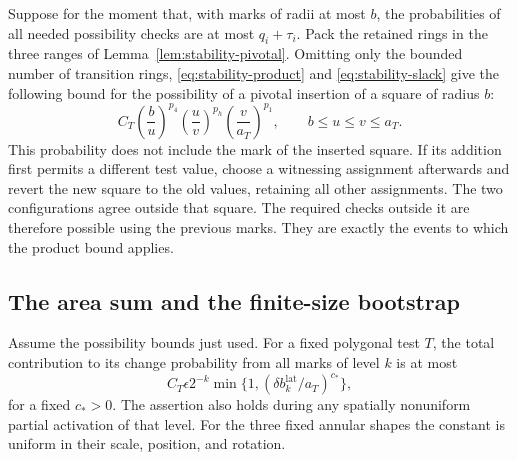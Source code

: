 Suppose for the moment that, with marks of radii at most $b$,
the probabilities of all needed possibility checks are at most
$q_i+\tau_i$.  Pack the retained rings in the three ranges of
Lemma~\ref{lem:stability-pivotal}.  Omitting only the bounded
number of transition rings, \eqref{eq:stability-product} and
\eqref{eq:stability-slack} give the following bound for the
possibility of a pivotal insertion of a square of radius $b$:
\begin{equation}
 C_T\left(\frac b u\right)^{p_4}
     \left(\frac u v\right)^{p_h}
     \left(\frac v{a_T}\right)^{p_1},
 \qquad b\leq u\leq v\leq a_T.
 \label{eq:stability-pivotal-probability}
\end{equation}
This probability does not include the mark of the inserted square.
If its addition first permits a different test value, choose a
witnessing assignment afterwards and revert the new square to
the old values, retaining all other assignments.  The two
configurations agree outside that square.  The required checks
outside it are therefore possible using the previous marks.
They are exactly the events to which the product bound applies.

\subsection{The area sum and the finite-size bootstrap}

\begin{lemma}
\label{lem:stability-area}
Assume the possibility bounds just used.  For a fixed polygonal
test $T$, the total contribution to its change probability from
all marks of level $k$ is at most
\begin{equation}
 C_T\epsilon 2^{-k}
       \min\{1,(\delta b_k^{\mathrm{lat}}/a_T)^{c_*}\},
 \label{eq:stability-level-bound}
\end{equation}
for a fixed $c_*>0$.  The assertion also holds during any spatially
nonuniform partial activation of that level.  For the three
fixed annular shapes the constant is uniform in their scale,
position, and rotation.
\end{lemma}

